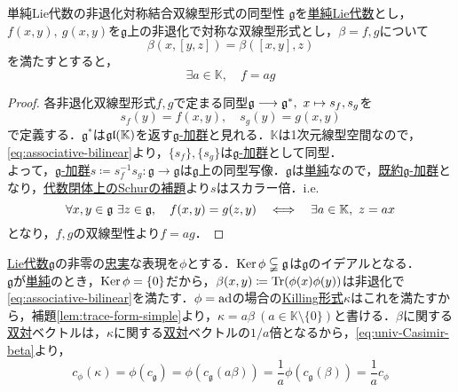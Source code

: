 \documentclass[rep_main]{subfiles}
\begin{document}
\begin{mylem}[label=lem:trace-form-simple]{単純Lie代数の非退化対称結合双線型形式の同型性}
	$\mathfrak{g}$を\hyperref[def:simple-LieAlg]{単純Lie代数}とし，$f(x, y),\ g(x, y)$を$\mathfrak{g}$上の非退化で対称な双線型形式とし，$\beta = f, g$について
	\begin{equation}
		\label{eq:associative-bilinear}
		\beta(x, [y, z]) = \beta([x, y], z)
	\end{equation}
	を満たすとすると，
	\begin{equation}
		\exists a \in \mathbb{K},\quad  f = ag
	\end{equation}
\end{mylem}
\begin{proof}
	各非退化双線型形式$f, g$で定まる同型$\mathfrak{g} \longrightarrow \mathfrak{g}^*,\ x \mapsto s_f, s_g$を
	\begin{equation}
		s_f(y) = f(x, y),\quad  s_g(y) = g(x, y)
	\end{equation}
	で定義する．$\mathfrak{g}^*$は$\mathfrak{gl}(\mathbb{K})$を返す\hyperref[ax:g-module]{$\mathfrak{g}$-加群}と見れる．$\mathbb{K}$は1次元線型空間なので，\eqref{eq:associative-bilinear}より，$\{s_f\}, \{s_g\}$は\hyperref[ax:g-module]{$\mathfrak{g}$-加群}として同型．\\
	よって，\hyperref[ax:g-module]{$\mathfrak{g}$-加群}$s \coloneqq s_f^{-1}s_g\colon \mathfrak{g} \to \mathfrak{g}$は$\mathfrak{g}$上の同型写像．$\mathfrak{g}$は\hyperref[def:simple-LieAlg]{単純}なので，\hyperref[def:irr]{既約$\mathfrak{g}$-加群}となり，\hyperref[col:Schur-closed]{代数閉体上のSchurの補題}より$s$はスカラー倍．i.e.
	\begin{equation}
		\forall x, y \in \mathfrak{g}\ \exists z \in \mathfrak{g},\quad  f(x, y) = g(z, y)  \quad \Longleftrightarrow \quad  \exists a \in \mathbb{K},\ z = ax
	\end{equation}
	となり，$f, g$の双線型性より$f = ag$．
\end{proof}
 \hyperref[ax:LieAlg]{Lie代数}$\mathfrak{g}$の非零の\hyperref[def:faithful]{忠実}な表現を$\phi$とする．$\operatorname{Ker}\phi \subsetneqq \mathfrak{g}$は$\mathfrak{g}$のイデアルとなる．\\
$\mathfrak{g}$が\hyperref[def:simple-LieAlg]{単純}のとき，$\operatorname{Ker}\phi = \{0\}$だから，$\beta(x, y) \coloneqq \Tr(\phi(x)\phi(y))$は非退化で\eqref{eq:associative-bilinear}を満たす．$\phi = \operatorname{ad}$の場合の\hyperref[def:Killing-form]{Killing形式}$\kappa$はこれを満たすから，補題\ref{lem:trace-form-simple}より，$\kappa = a\beta\ (a \in \mathbb{K} \setminus \{0\})$と書ける．$\beta$に関する\hyperref[lem:Casimir]{双対}ベクトルは，$\kappa$に関する\hyperref[lem:Casimir]{双対}ベクトルの$1/a$倍となるから，\eqref{eq:univ-Casimir-beta}より，
\begin{equation}
	c_\phi(\kappa) = \phi(c_\mathfrak{g}) = \phi(c_\mathfrak{g}(a\beta)) = \frac{1}{a}\phi(c_\mathfrak{g}(\beta)) = \frac{1}{a}c_\phi
\end{equation}
\end{document}
